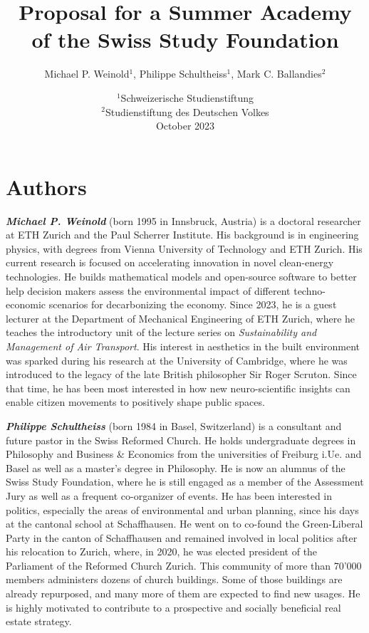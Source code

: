 \documentclass{article}
\title{Proposal for a Summer Academy \protect\\ of the Swiss Study Foundation}
\author{Michael P. Weinold$^1$, Philippe Schultheiss$^1$, Mark C. Ballandies$^2$}
\date{
    $^1$Schweizerische Studienstiftung \\
    $^2$Studienstiftung des Deutschen Volkes \\[3mm]
    October 2023
}
\begin{document}
\maketitle

\section*{\centering Authors}

\textbf{\textit{Michael P. Weinold}} (born 1995 in Innsbruck, Austria) is a doctoral researcher at ETH Zurich and the Paul Scherrer Institute. His background is in engineering physics, with degrees from Vienna University of Technology and ETH Zurich. His current research is focused on accelerating innovation in novel clean-energy technologies. He builds mathematical models and open-source software to better help decision makers assess the environmental impact of different techno-economic scenarios for decarbonizing the economy. Since 2023, he is a guest lecturer at the Department of Mechanical Engineering of ETH Zurich, where he teaches the introductory unit of the lecture series on \textit{Sustainability and Management of Air Transport}. His interest in aesthetics in the built environment was sparked during his research at the University of Cambridge, where he was introduced to the legacy of the late British philosopher Sir Roger Scruton. Since that time, he has been most interested in how new neuro-scientific insights can enable citizen movements to positively shape public spaces.

\textbf{\textit{Philippe Schultheiss}} (born 1984 in Basel, Switzerland) is a consultant and future pastor in the Swiss Reformed Church. He holds undergraduate degrees in Philosophy and Business \& Economics from the universities of Freiburg i.Ue. and Basel as well as a master's degree in Philosophy. He is now an alumnus of the Swiss Study Foundation, where he is still engaged as a member of the Assessment Jury as well as a frequent co-organizer of events. He has been interested in politics, especially the areas of environmental and urban planning, since his days at the cantonal school at Schaffhausen. He went on to co-found the Green-Liberal Party in the canton of Schaffhausen and remained involved in local politics after his relocation to Zurich, where, in 2020, he was elected president of the Parliament of the Reformed Church Zurich. This community of more than 70'000
members administers dozens of church buildings. Some of those buildings are already repurposed, and many more of them are expected to find new usages. He is highly motivated to contribute to a prospective and socially beneficial real estate strategy.
\end{document}
